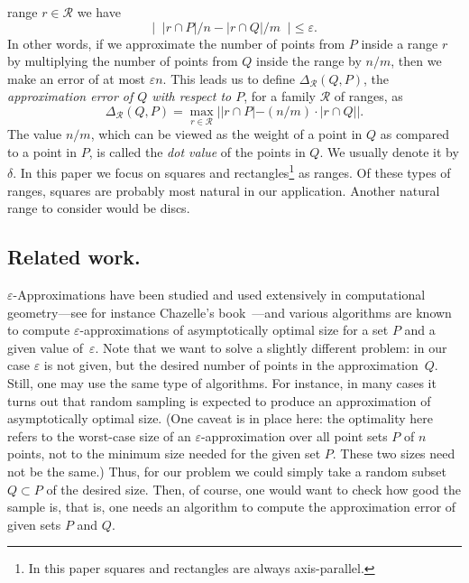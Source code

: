 \documentclass{elsart}
\newcommand{\eps}{\varepsilon}               %
\newcommand{\ranges}{{\mathcal R}}
\begin{document}
range $r \in \ranges$ we have
\[
\left| \;\; |r \cap P|/n - |r \cap Q|/m \;\; \right| \leq \eps.
\]
In other words, if we approximate the number of points from $P$ inside a
range $r$ by multiplying the number of points from $Q$ inside the range by
$n/m$, then we make an error of at most $\eps n$.
This leads us to define $\Delta_{\ranges}(Q,P)$, the \emph{approximation
error of $Q$ with respect to $P$}, for a family $\ranges$ of ranges, as
\[
\Delta_{\ranges}(Q,P)
   = \max_{r\in\ranges} | |r \cap P| - (n/m) \cdot |r \cap Q| |.
\]
The value $n/m$, which can be viewed as the weight of a point in $Q$
as compared to a point in $P$, is called the \emph{dot value} of the points in $Q$.
We usually denote it by $\delta$.
In this paper we focus on squares and rectangles\footnote{In this
paper squares and rectangles are always axis-parallel.}  as ranges.
Of these types of ranges, squares are probably most natural in our
application. Another natural range to consider would be discs.

\subsection{Related work.}
$\eps$-Approximations have been studied and used extensively in
computational geometry---see for instance Chazelle's
book~\cite{c01}---and various algorithms are known to compute
$\eps$-approximations of asymptotically optimal size for a set $P$ and
a given value of~$\eps$. Note that we want to solve a slightly
different problem: in our case $\eps$ is not given, but the desired
number of points in the approximation~$Q$. Still, one may use the same
type of algorithms. For instance, in many cases it turns out that
random sampling is expected to produce an approximation of
asymptotically optimal size. (One caveat is in place here: the
optimality here refers to the worst-case size of an
$\eps$-approximation over all point sets $P$ of $n$ points, not to the
minimum size needed for the given set $P$. These two sizes need not be
the same.) Thus, for our problem we could simply take a random subset
$Q\subset P$ of the desired size. Then, of course, one would want
to check how good the sample is, that is, one needs an algorithm
to compute the approximation error of given sets $P$ and $Q$.
\end{document}
